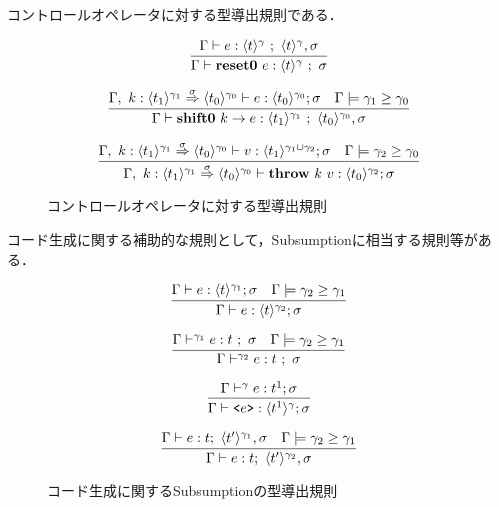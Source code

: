 コントロールオペレータに対する型導出規則である．

\begin{figure}[H]
  \centering
  \[
    \infer{\Gamma \vdash \resetz{e} : \codeT{t}{\gamma} ~;~ \sigma}
    {\Gamma \vdash e : \codeT{t}{\gamma} ~;~ \codeT{t}{\gamma}, \sigma}
  \]

  \[
    \infer{\Gamma \vdash \shiftz{k}{e} : \codeT{t_1}{\gamma_1} ~;~ \codeT{t_0}{\gamma_0},\sigma}
    {\Gamma,~k:\contT{\codeT{t_1}{\gamma_1}}{\codeT{t_0}{\gamma_0}}{\sigma}
      \vdash e : \codeT{t_0}{\gamma_0} ; \sigma
      & \Gamma \models \gamma_1 \ord \gamma_0
    }
  \]

  \[
    \infer
    {\Gamma,~ k:\contT{\codeT{t_1}{\gamma_1}}{\codeT{t_0}{\gamma_0}}{\sigma}
      \vdash \throw{k}{v} : \codeT{t_0}{\gamma_2} ; \sigma}
    {\Gamma,~ k:\contT{\codeT{t_1}{\gamma_1}}{\codeT{t_0}{\gamma_0}}{\sigma}
      \vdash v : \codeT{t_1}{\gamma_1 \cup \gamma_2} ; \sigma
      & \Gamma \models \gamma_2 \ord \gamma_0
    }
  \]
  \caption{コントロールオペレータに対する型導出規則}
  \label{fig:controlop_type_rule}
\end{figure}


コード生成に関する補助的な規則として，Subsumptionに相当する規則等がある．


\begin{figure}[H]
  \centering
  \[
    \infer
    {\Gamma \vdash e : \codeT{t}{\gamma_2} ; \sigma}
    {\Gamma \vdash e : \codeT{t}{\gamma_1} ; \sigma
      & \Gamma \models \gamma_2 \ord \gamma_1
    }
  \]

  \[
    \infer
    {\Gamma \vdash^{\gamma_2} e : t ~;~ \sigma}
    {\Gamma \vdash^{\gamma_1} e : t ~;~ \sigma
      & \Gamma \models \gamma_2 \ord \gamma_1
    }
  \]


  \[
    \infer
    {\Gamma \vdash \code{e} : \codeT{t^1}{\gamma} ; \sigma}
    {\Gamma \vdash^{\gamma} e : t^1 ; \sigma}
  \]

  \[
    \infer
    {\Gamma \vdash e : t;~\codeT{t'}{\gamma_2},\sigma}
    {\Gamma \vdash e : t;~\codeT{t'}{\gamma_1},\sigma
      & \Gamma \models \gamma_2 \ord \gamma_1
    }
  \]

  \caption{コード生成に関するSubsumptionの型導出規則}
  \label{fig:code_gen_subs_type_rule}
\end{figure}

